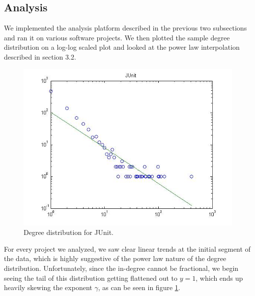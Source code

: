 \documentclass[11pt,a4paper,twocolumn]{article}
\begin{document}
\begin{singlespace}
\subsection{Analysis}
We implemented the analysis platform described in the previous two subsections
and ran it on
various software projects. We then plotted the sample degree distribution on a log-log
scaled plot and looked at the power law interpolation described in section 3.2.
\begin{figure}
\centering
\caption{Degree distribution for JUnit.\label{fig:marsold}}
\includegraphics[scale=0.4]{images/marsold}
\end{figure}
For every project we analyzed, we saw clear linear trends at the initial segment of the
data, which is highly suggestive of the power law nature of the degree distribution.
Unfortunately, since the in-degree cannot be fractional, we begin seeing the tail
of this distribution getting flattened out to $y = 1$, which ends up heavily skewing
the exponent $\gamma$, as can be seen in figure \ref{fig:marsold}.


\end{singlespace}
\end{document}
